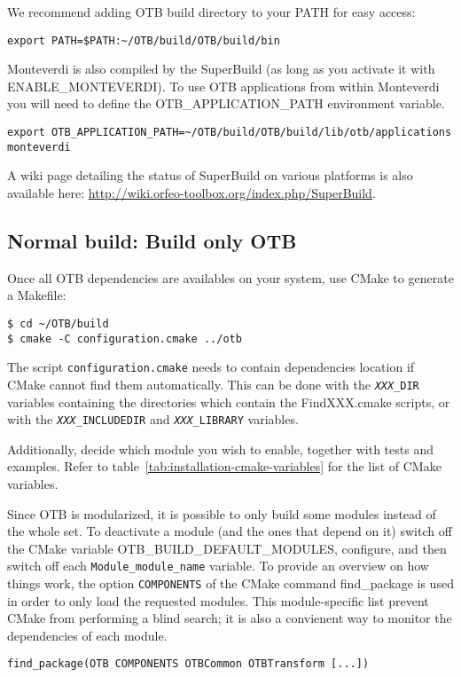 We recommend adding OTB build directory to your PATH for easy access:
\begin{verbatim}
export PATH=$PATH:~/OTB/build/OTB/build/bin
\end{verbatim}

Monteverdi is also compiled by the SuperBuild (as long as you activate it with
ENABLE\_MONTEVERDI). To use OTB applications from within Monteverdi you will need
to define the OTB\_APPLICATION\_PATH environment variable.
\begin{verbatim}
export OTB_APPLICATION_PATH=~/OTB/build/OTB/build/lib/otb/applications
monteverdi
\end{verbatim}

A wiki page detailing the status of SuperBuild on various platforms is also available here:
\url{http://wiki.orfeo-toolbox.org/index.php/SuperBuild}.

\subsection{Normal build: Build only OTB}
\label{sec:installation-linux-normalbuild}

Once all OTB dependencies are availables on your system, use CMake to generate a Makefile:
\begin{verbatim}
$ cd ~/OTB/build
$ cmake -C configuration.cmake ../otb
\end{verbatim}
The script \texttt{configuration.cmake} needs to contain dependencies location if CMake cannot find them automatically.
This can be done with the \texttt{\textit{XXX}\_DIR} variables containing the directories which contain the
FindXXX.cmake scripts, or with the \texttt{\textit{XXX}\_INCLUDEDIR} and \texttt{\textit{XXX}\_LIBRARY} variables.

Additionally, decide which module you wish to enable, together with tests and examples.
Refer to table~\ref{tab:installation-cmake-variables} for the list of CMake variables.

Since OTB is modularized, it is possible to only build some modules instead of the whole set. 
To deactivate a module (and the ones that depend on it) switch off the CMake variable OTB\_BUILD\_DEFAULT\_MODULES,
configure, and then switch off each \texttt{Module\_module\_name} variable.
To provide an overview on how things work, the option \texttt{COMPONENTS} of the CMake command find\_package is used in
order to only load the requested modules.
This module-specific list prevent CMake from performing a blind search; it is also a convienent way to monitor the
dependencies of each module.
\begin{verbatim}
find_package(OTB COMPONENTS OTBCommon OTBTransform [...])
\end{verbatim} 

